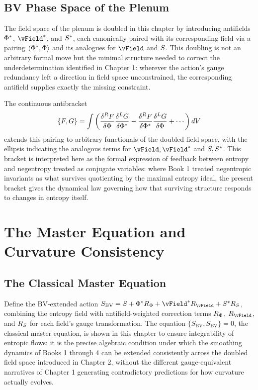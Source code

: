 \chapter{BV Phase Space of the Plenum}

The field space of the plenum is doubled in this chapter by introducing antifields $\Phi^{*}$, $\vField^{*}$, and $S^{*}$, each canonically paired with its corresponding field via a pairing $\langle \Phi^{*}, \Phi \rangle$ and its analogues for $\vField$ and $S$. This doubling is not an arbitrary formal move but the minimal structure needed to correct the underdetermination identified in Chapter 1: wherever the action's gauge redundancy left a direction in field space unconstrained, the corresponding antifield supplies exactly the missing constraint.

The continuous antibracket
\[
\{F, G\} = \int \left( \frac{\delta^R F}{\delta \Phi} \frac{\delta^L G}{\delta \Phi^{*}} - \frac{\delta^R F}{\delta \Phi^{*}} \frac{\delta^L G}{\delta \Phi} + \cdots \right) dV
\]
extends this pairing to arbitrary functionals of the doubled field space, with the ellipsis indicating the analogous terms for $\vField, \vField^{*}$ and $S, S^{*}$. This bracket is interpreted here as the formal expression of feedback between entropy and negentropy treated as conjugate variables: where Book 1 treated negentropic invariants as what survives quotienting by the maximal entropy ideal, the present bracket gives the dynamical law governing how that surviving structure responds to changes in entropy itself.

\part{The Master Equation and Curvature Consistency}

\chapter{The Classical Master Equation}

Define the BV-extended action $S_{\text{BV}} = \SEntropy + \PhiField^{*} R_{\PhiField} + \vField^{*} R_{\vField} + \SEntropy^{*} R_{\SEntropy}$, combining the entropy field with antifield-weighted correction terms $R_{\Phi}$, $R_{\vField}$, and $R_{S}$ for each field's gauge transformation. The equation $\{S_{\text{BV}}, S_{\text{BV}}\} = 0$, the classical master equation, is shown in this chapter to ensure integrability of entropic flows: it is the precise algebraic condition under which the smoothing dynamics of Books 1 through 4 can be extended consistently across the doubled field space introduced in Chapter 2, without the different gauge-equivalent narratives of Chapter 1 generating contradictory predictions for how curvature actually evolves.

